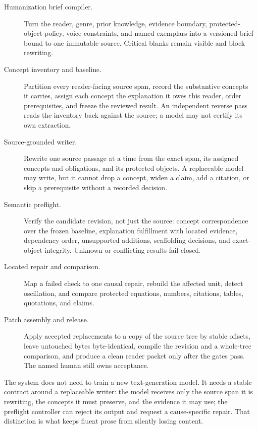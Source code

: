 \begin{description}
\item[Humanization brief compiler.] Turn the reader, genre, prior knowledge,
  evidence boundary, protected-object policy, voice constraints, and named
  exemplars into a versioned brief bound to one immutable source. Critical
  blanks remain visible and block rewriting.
\item[Concept inventory and baseline.] Partition every reader-facing source
  span, record the substantive concepts it carries, assign each concept the
  explanation it owes this reader, order prerequisites, and freeze the reviewed
  result. An independent reverse pass reads the inventory back against the
  source; a model may not certify its own extraction.
\item[Source-grounded writer.] Rewrite one source passage at a time from the
  exact span, its assigned concepts and obligations, and its protected objects.
  A replaceable model may write, but it cannot drop a concept, widen a claim,
  add a citation, or skip a prerequisite without a recorded decision.
\item[Semantic preflight.] Verify the candidate revision, not just the source:
  concept correspondence over the frozen baseline, explanation fulfillment with
  located evidence, dependency order, unsupported additions, scaffolding
  decisions, and exact-object integrity. Unknown or conflicting results fail
  closed.
\item[Located repair and comparison.] Map a failed check to one causal repair,
  rebuild the affected unit, detect oscillation, and compare protected
  equations, numbers, citations, tables, quotations, and claims.
\item[Patch assembly and release.] Apply accepted replacements to a copy of the
  source tree by stable offsets, leave untouched bytes byte-identical, compile
  the revision and a whole-tree comparison, and produce a clean reader packet
  only after the gates pass. The named human still owns acceptance.
\end{description}

The system does not need to train a new text-generation model. It needs a stable
contract around a replaceable writer: the model receives only the source span it
is rewriting, the concepts it must preserve, and the evidence it may use; the
preflight controller can reject its output and request a cause-specific repair.
That distinction is what keeps fluent prose from silently losing content.

